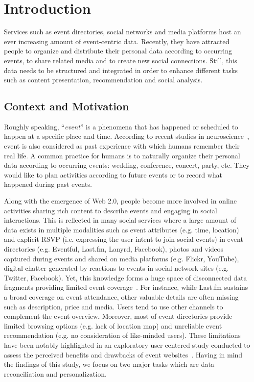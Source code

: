 \chapter{Introduction}  \label{ch:intro}
Services such as event directories, social networks and media platforms host an ever increasing amount of event-centric data. Recently, they have attracted people to organize and distribute their personal data according to occurring events, to share related media and to create new social connections. Still, this data needs to be structured and integrated in order to enhance different tasks such as content presentation, recommendation and social analysis. 

\section{Context and Motivation}      \label{sec:motivation}
Roughly speaking, ``\emph{event}'' is a phenomena that has happened or scheduled to happen at a specific place and time. According to recent studies in neuroscience~\cite{Zacks:01}, event is also considered as past experience with which humans remember their real life. A common practice for humans is to naturally organize their personal data according to occurring events: wedding, conference, concert, party, etc. They would like to plan activities according to future events or to record what happened during past events.

Along with the emergence of Web 2.0, people become more involved in online activities sharing rich content to describe events and engaging in social interactions. This is reflected in many social services where a large amount of data exists in multiple modalities such as event attributes (e.g. time, location) and explicit RSVP (i.e. expressing the user intent to join social events) in event directories (e.g. Eventful, Last.fm, Lanyrd, Facebook), photos and videos captured during events and shared on media platforms (e.g. Flickr, YouTube), digital chatter generated by reactions to events in social network sites (e.g. Twitter, Facebook). Yet, this knowledge forms a huge space of disconnected data fragments providing limited event coverage~\cite{Fialho:EVENTS10}. For instance, while Last.fm sustains a broad coverage on event attendance, other valuable details are often missing such as description, price and media. Users tend to use other channels to complement the event overview. Moreover, most of event directories provide limited browsing options (e.g. lack of location map) and unreliable event recommendation (e.g. no consideration of like-minded users). These limitations have been notably highlighted in an exploratory user centered study conducted to assess the perceived benefits and drawbacks of event websites~\cite{Troncy:COLD10}. Having in mind the findings of this study, we focus on two major tasks which are data reconciliation and personalization.


